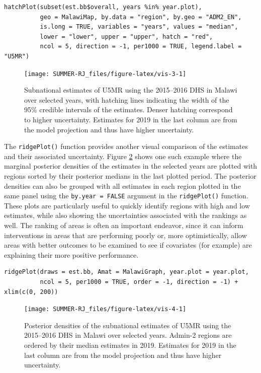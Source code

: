 \begin{verbatim}
hatchPlot(subset(est.bb$overall, years %in% year.plot), 
          geo = MalawiMap, by.data = "region", by.geo = "ADM2_EN", 
          is.long = TRUE, variables = "years", values = "median", 
          lower = "lower", upper = "upper", hatch = "red",
          ncol = 5, direction = -1, per1000 = TRUE, legend.label = "U5MR")
\end{verbatim}

\begin{figure}[!ht]
\texttt{[image: SUMMER-RJ\_files/figure-latex/vis-3-1]} \caption{Subnational estimates of U5MR using the 2015--2016 DHS in Malawi over selected years, with hatching lines indicating the width of the 95\% credible intervals of the estimates. Denser hatching correspond to higher uncertainty. Estimates for 2019 in the last column are from the model projection and thus have higher uncertainty.}\label{fig:vis-3}
\end{figure}

The \texttt{ridgePlot()} function provides another visual comparison of the estimates and their associated uncertainty. Figure \ref{fig:vis-4} shows one such example where the marginal posterior densities of the estimates in the selected years are plotted with regions sorted by their posterior medians in the last plotted period. The posterior densities can also be grouped with all estimates in each region plotted in the same panel using the \texttt{by.year\ =\ FALSE} argument in the \texttt{ridgePlot()} function. These plots are particularly useful to quickly identify regions with high and low estimates, while also showing the uncertainties associated with the rankings as well. The ranking of areas is often an important endeavor, since it can inform interventions in areas that are performing poorly or, more optimistically, allow areas with better outcomes to be examined to see if covariates (for example) are explaining their more positive performance.

\begin{verbatim}
ridgePlot(draws = est.bb, Amat = MalawiGraph, year.plot = year.plot,
          ncol = 5, per1000 = TRUE, order = -1, direction = -1) + xlim(c(0, 200))
\end{verbatim}

\begin{figure}[!ht]
\texttt{[image: SUMMER-RJ\_files/figure-latex/vis-4-1]} \caption{Posterior densities of the subnational estimates of U5MR using the 2015--2016 DHS in Malawi over selected years. Admin-2 regions are ordered by their median estimates in 2019. Estimates for 2019 in the last column are from the model projection and thus have higher uncertainty.}\label{fig:vis-4}
\end{figure}

